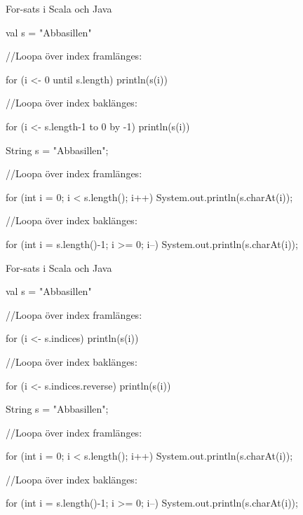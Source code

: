 \begin{Slide}{For-sats i Scala och Java}
\begin{multicols}{2}
\begin{CodeSmall}[basicstyle=\ttfamily\SlideFontSize{6}{8}]
val s = "Abbasillen"

//Loopa över index framlänges:
  
for (i <- 0 until s.length) {
  println(s(i))
}
  
//Loopa över index baklänges:
 
for (i <- s.length-1 to 0 by -1) {
  println(s(i))
}  
\end{CodeSmall}

\columnbreak

\begin{CodeSmall}[language=Java,basicstyle=\ttfamily\SlideFontSize{6}{8}]
String s = "Abbasillen";

//Loopa över index framlänges:

for (int i = 0; i < s.length(); i++){
    System.out.println(s.charAt(i));
}

//Loopa över index baklänges:
 
for (int i = s.length()-1; i >= 0; i--){
    System.out.println(s.charAt(i));
}
\end{CodeSmall}
\end{multicols}
\end{Slide}

\begin{Slide}{For-sats i Scala och Java}
\begin{multicols}{2}
\begin{CodeSmall}[basicstyle=\ttfamily\SlideFontSize{6}{8}]
val s = "Abbasillen"

//Loopa över index framlänges:
  
for (i <- s.indices) {
  println(s(i))
}
  
//Loopa över index baklänges:
 
for (i <- s.indices.reverse) {
  println(s(i))
}
\end{CodeSmall}

\columnbreak

\begin{CodeSmall}[language=Java,basicstyle=\ttfamily\SlideFontSize{6}{8}]
String s = "Abbasillen";

//Loopa över index framlänges:

for (int i = 0; i < s.length(); i++){
    System.out.println(s.charAt(i));
}

//Loopa över index baklänges:
 
for (int i = s.length()-1; i >= 0; i--){
    System.out.println(s.charAt(i));
}
\end{CodeSmall}
\end{multicols}
\end{Slide}


